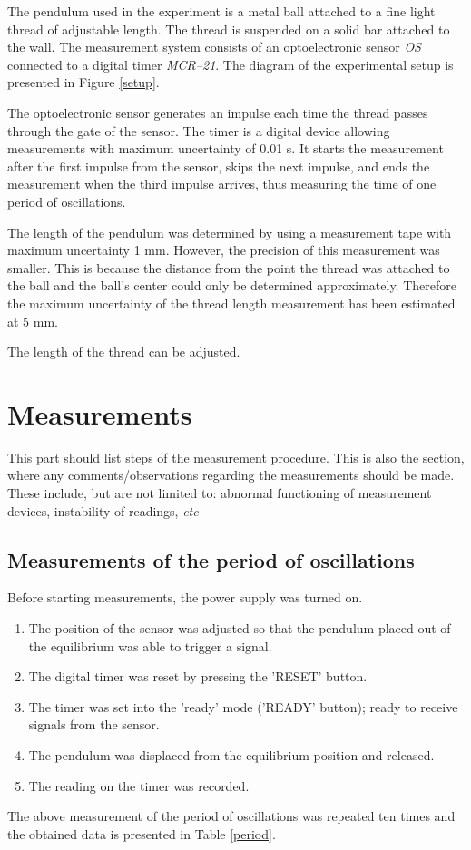 \documentclass{article}
\begin{document}
The pendulum used in the experiment is a metal ball attached to a fine light thread of adjustable length. The thread is suspended on a solid bar attached to the wall.  The measurement system consists of an optoelectronic sensor \textit{OS} connected to a digital timer \textit{MCR--21}. The diagram of the experimental setup is presented in Figure \ref{setup}.



The optoelectronic sensor generates an impulse each time the thread passes through  the gate of the sensor.  The timer is a digital device allowing measurements with maximum uncertainty of 0.01 s.  It starts the measurement after the first impulse from the sensor, skips the next impulse, and ends the measurement when the third impulse arrives, thus measuring the time of one period of oscillations.

The length of the pendulum was determined by using a measurement tape with maximum uncertainty 1 mm.  However, the precision of this measurement was smaller.  This is because the distance from the point the thread was attached to the ball and the ball's center could only be determined approximately. Therefore the maximum uncertainty of the thread length measurement has been estimated at 5 mm. 

The length of the thread can be adjusted.

\section{Measurements}
{\color{blue}This part should list steps of the measurement procedure. This is also the section, where any comments/observations regarding the measurements should be made.  These include, but are not limited to: abnormal functioning of measurement devices, instability of readings, \textit{etc}}

\subsection{Measurements of the period of oscillations\label{proc1}}

Before starting measurements, the power supply was turned on.
\begin{enumerate}
\item The position of the sensor was adjusted so that the pendulum placed out of the equilibrium was able to trigger a signal.
\item The digital timer was reset by pressing the 'RESET' button.
\item The timer was set into the 'ready' mode ('READY' button); ready to receive signals from the sensor.
\item The pendulum was displaced from the equilibrium position and released.
\item The reading on the timer was recorded.
\end{enumerate}
The above measurement of the period of oscillations was repeated ten times and the obtained data is presented in Table \ref{period}.
\end{document}
